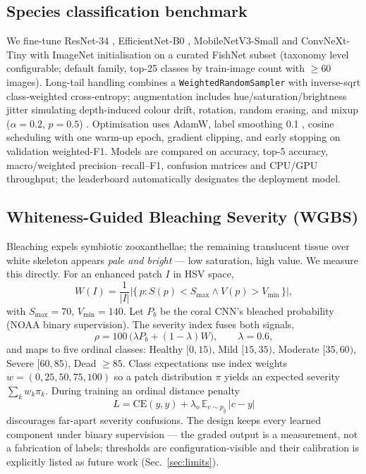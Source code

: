 \documentclass[conference]{IEEEtran}
\begin{document}
\subsection{Species classification benchmark}
We fine-tune ResNet-34 \cite{he2016resnet}, EfficientNet-B0 \cite{tan2019efficientnet}, MobileNetV3-Small \cite{howard2019mobilenet} and ConvNeXt-Tiny \cite{liu2022convnext} with ImageNet initialisation on a curated FishNet subset (taxonomy level configurable; default family, top-25 classes by train-image count with $\ge$60 images). Long-tail handling combines a \texttt{WeightedRandomSampler} with inverse-sqrt class-weighted cross-entropy; augmentation includes hue/saturation/brightness jitter simulating depth-induced colour drift, rotation, random erasing, and mixup ($\alpha{=}0.2$, $p{=}0.5$) \cite{zhang2018mixup}. Optimisation uses AdamW, label smoothing 0.1 \cite{szegedy2016inception}, cosine scheduling with one warm-up epoch, gradient clipping, and early stopping on validation weighted-F1. Models are compared on accuracy, top-5 accuracy, macro/weighted precision--recall--F1, confusion matrices and CPU/GPU throughput; the leaderboard automatically designates the deployment model.

\subsection{Whiteness-Guided Bleaching Severity (WGBS)}
\label{sec:wgbs}
Bleaching expels symbiotic zooxanthellae; the remaining translucent tissue over white skeleton appears \emph{pale and bright} --- low saturation, high value. We measure this directly. For an enhanced patch $I$ in HSV space,
\begin{equation}
W(I) = \frac{1}{|I|}\big|\{\,p : S(p) < S_{\max} \wedge V(p) > V_{\min}\,\}\big|,
\label{eq:whiteness}
\end{equation}
with $S_{\max}{=}70$, $V_{\min}{=}140$. Let $P_b$ be the coral CNN's bleached probability (NOAA binary supervision). The severity index fuses both signals,
\begin{equation}
\rho = 100\,\big(\lambda P_b + (1-\lambda) W\big), \qquad \lambda = 0.6,
\label{eq:bsi}
\end{equation}
and maps to five ordinal classes: Healthy $[0,15)$, Mild $[15,35)$, Moderate $[35,60)$, Severe $[60,85)$, Dead $\ge 85$. Class expectations use index weights $w=(0,25,50,75,100)$ so a patch distribution $\pi$ yields an expected severity $\sum_k w_k\pi_k$. During training an ordinal distance penalty
\begin{equation}
L = \mathrm{CE}(y,\hat y) + \lambda_o\, \mathbb{E}_{c\sim p_{\hat y}}\,|c - y|
\end{equation}
discourages far-apart severity confusions. The design keeps every learned component under binary supervision --- the graded output is a measurement, not a fabrication of labels; thresholds are configuration-visible and their calibration is explicitly listed as future work (Sec.~\ref{sec:limits}).
\end{document}
